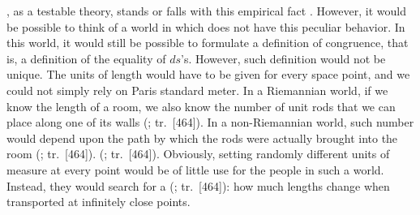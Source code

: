\documentclass[submitted]{article}
\renewcommand{\rzlap}[2]{(\cite[#1]{Reichenbach1928}; tr.\ [#2])\xspace}
\begin{document}
\Gr, as a testable theory, stands or falls with this empirical fact . However, it would be possible to think of a world in which \rac does not have this peculiar  behavior. In this world, it would still be possible to formulate a definition of congruence, that is, a definition of the equality of $ds$'s. However, such definition would not be unique. The units of length would have to be given for every space point, and we could not simply rely on Paris standard meter. In a Riemannian world, if we know the length of a room, we also know the number of unit rods that we can place along one of its walls \rzlap{333}{464}. In a non-Riemannian world, such number would depend upon the path by which the rods were actually brought into the room \rzlap{333}{464}.  \rzlap{333}{464}. Obviously, setting randomly different units of measure at every point would be of little use for the people in such a world. Instead, they would search for a  \rzlap{333}{464}: how much lengths change when transported at infinitely close points.

\end{document}
